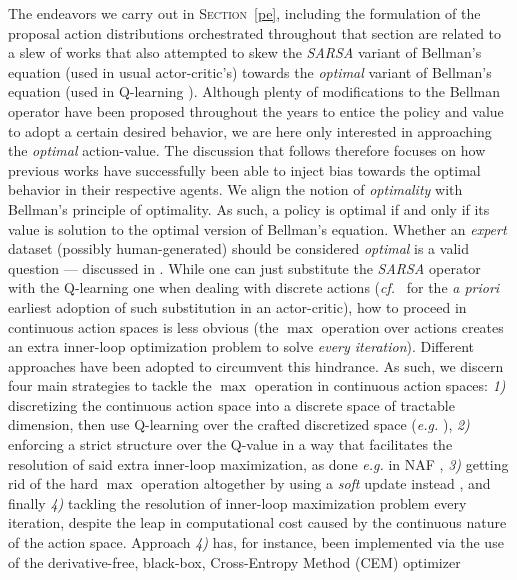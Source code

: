 The endeavors we carry out in \textsc{Section}~\ref{pe}, including the formulation of the proposal
action distributions orchestrated throughout that section are related to a slew of works that
also attempted to skew the \textit{SARSA} variant of Bellman's equation (used in usual actor-critic's)
towards the \emph{optimal} variant of Bellman's equation (used in Q-learning
\cite{Watkins1989-ir, Watkins1992-gl}).
Although plenty of modifications to the Bellman operator have been proposed throughout the years
to entice the policy and value to adopt a certain desired behavior,
we are here only interested in approaching the \emph{optimal} action-value.
The discussion that follows therefore focuses on how previous works have successfully been able to
inject bias towards the optimal behavior in their respective agents.
We align the notion of \emph{optimality} with Bellman's principle of optimality.
As such, a policy is optimal if and only if its value is solution to the optimal version of Bellman's equation.
Whether an \textit{expert} dataset (possibly human-generated) should be considered \textit{optimal} is
a valid question --- discussed in \cite{Rust1992-wa}.
While one can just substitute the \textit{SARSA} operator with the Q-learning one
when dealing with discrete actions (\textit{cf.}~\cite{Crites1995-hn}
for the \textit{a priori} earliest adoption of such substitution in an actor-critic),
how to proceed in continuous action spaces is less obvious
(the $\max$ operation over actions creates an extra inner-loop optimization problem to solve \emph{every iteration}).
Different approaches have been adopted to circumvent this hindrance.
As such, we discern four main strategies to tackle the $\max$ operation in continuous action spaces:
\textit{1)} discretizing the continuous action space
into a discrete space of tractable dimension, then use Q-learning over the crafted discretized space
(\textit{e.g.} \cite{Millan2002-sl, Kimura2007-di, Metz2017-ol}),
\textit{2)} enforcing a strict structure over the Q-value in a way that facilitates the resolution of
said extra inner-loop maximization, as done \textit{e.g.} in NAF \cite{Gu2016-zd},
\textit{3)} getting rid of the hard $\max$ operation altogether by using a \emph{soft} update
instead \cite{Haarnoja2017-wj}, and finally
\textit{4)} tackling the resolution of inner-loop maximization problem every iteration,
despite the leap in computational cost caused by the continuous nature of the action space.
Approach \textit{4)} has, for instance, been implemented via the use of the derivative-free, black-box,
Cross-Entropy Method (CEM) \cite{Rubinstein1999-qt, Mannor2003-sj} optimizer
